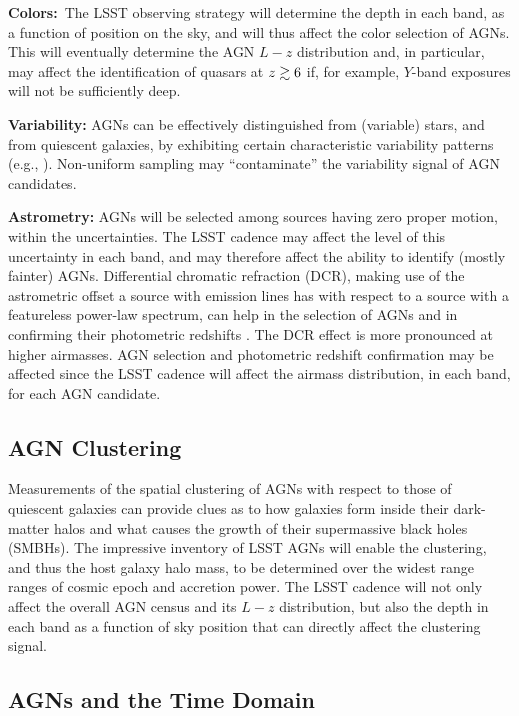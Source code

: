 {\bf Colors:}~The LSST observing strategy will determine the depth in each band, as a function of position on the sky, and will thus affect
the color selection of AGNs. This will eventually determine the AGN $L-z$ distribution and, in particular, may affect the identification
of quasars at $z\gtrsim 6$ if, for example, $Y$-band exposures will not be sufficiently deep.

{\bf Variability:} AGNs can be effectively distinguished from (variable) stars, and from quiescent galaxies, by exhibiting certain characteristic variability patterns (e.g., \citet{ButlerandBloom2011}). Non-uniform sampling may ``contaminate'' the variability signal of AGN candidates.

{\bf Astrometry:} AGNs will be selected among sources having zero proper motion, within the uncertainties. The LSST cadence
may affect the level of this uncertainty in each band, and may therefore affect the ability to identify (mostly fainter) AGNs.
%
Differential chromatic refraction (DCR), making use of the astrometric offset a source with emission lines has with respect to
a source with a featureless power-law spectrum, can help in the selection of AGNs and in confirming their photometric redshifts \citep{KaczmarczikEtal2009}. The DCR effect is more pronounced at higher airmasses. AGN selection and photometric redshift confirmation may be affected since the LSST cadence will affect the airmass distribution, in each band, for each AGN candidate.

\subsection{AGN Clustering}
\label{sec:\secname:clustering}

\noindent Measurements of the spatial clustering of AGNs with respect to those of quiescent galaxies can provide clues as to how galaxies
form inside their dark-matter halos and what causes the growth of their supermassive black holes (SMBHs). The impressive inventory 
of LSST AGNs will enable the clustering, and thus the host galaxy halo mass, to be determined over the widest range ranges of cosmic
epoch and accretion power.
%
The LSST cadence will not only affect the overall AGN census and its $L-z$ distribution, but also the
depth in each band as a function of sky position that can directly affect the clustering signal.

\subsection{AGNs and the Time Domain}
\label{sec:\secname:time}


